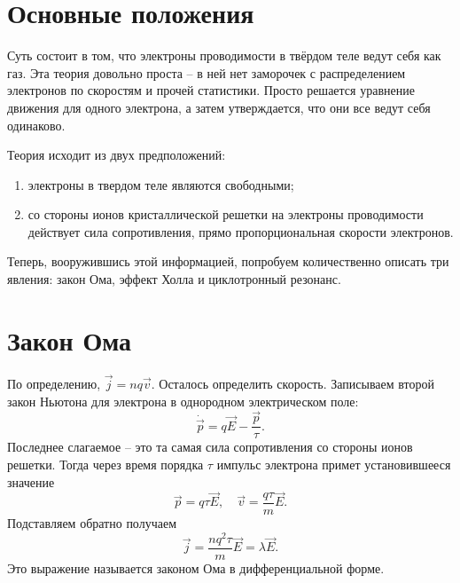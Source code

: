 \section{Основные положения}

Суть состоит в том, что электроны проводимости в твёрдом теле ведут себя как
газ. Эта теория довольно проста -- в ней нет заморочек с распределением
электронов по скоростям и прочей статистики. Просто решается уравнение движения
для одного электрона, а затем утверждается, что они все ведут себя одинаково.

Теория исходит из двух предположений:
\begin{enumerate}
    \item электроны в твердом теле являются свободными;
    \item со стороны ионов кристаллической решетки на электроны проводимости
    действует сила сопротивления, прямо пропорциональная скорости электронов.
\end{enumerate}

Теперь, вооружившись этой информацией, попробуем количественно описать три
явления: закон Ома, эффект Холла и циклотронный резонанс.

\section{Закон Ома}
    По определению, \( \vec{j} = nq\vec{v} \). Осталось определить скорость.
    Записываем второй закон Ньютона для электрона в однородном электрическом
    поле:
    \[
        \dot{\vec{p}} = q\vec{E} - \frac{\vec{p}}{\tau}.
    \]
    Последнее слагаемое -- это та самая сила сопротивления со стороны ионов
    решетки. Тогда через время порядка \( \tau \) импульс электрона примет
    установившееся значение
    \[
        \vec{p} = q\tau\vec{E},\quad \vec{v} = \frac{q\tau}{m}\vec{E}.
    \]
    Подставляем обратно получаем
    \[
        \vec{j} = \frac{nq^2\tau}{m}\vec{E} = \lambda\vec{E}.
    \]
    Это выражение называется законом Ома в дифференциальной форме.

